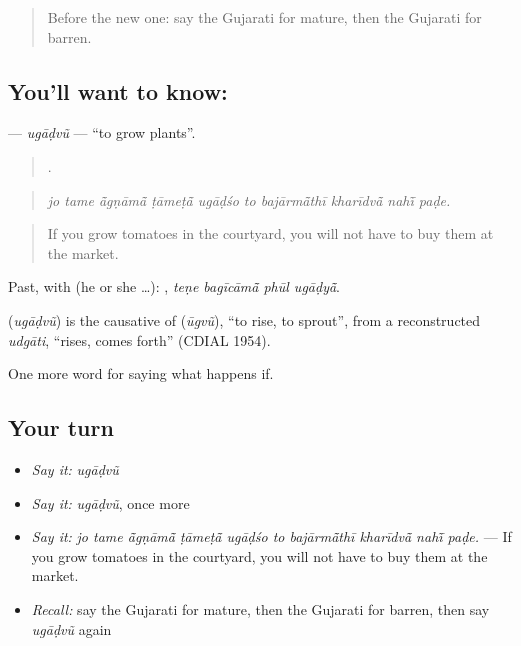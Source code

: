 \label{lesson:GU-C390-ugadvu}



\begin{quote}
Before the new one: say the Gujarati for mature, then the Gujarati for barren.
\end{quote}

\subsection*{You'll want to know: }
\textbf{} — \emph{ugāḍvũ} — \textquotedblleft{}to grow plants\textquotedblright{}.

\begin{quote}
         .
\end{quote}

\begin{quote}
\emph{jo tame ā̃gṇāmā̃ ṭāmeṭā̃ ugāḍśo to bajārmā̃thī kharīdvā̃ nahī̃ paḍe.}
\end{quote}

\begin{quote}
If you grow tomatoes in the courtyard, you will not have to buy them at the market.
\end{quote}

Past, with  (he or she …):    , \emph{teṇe bagīcāmā̃ phūl ugāḍyā̃}.

\begin{cousinweb}
\textbf{} (\emph{ugāḍvũ}) is the causative of \textbf{} (\emph{ūgvũ}), \textquotedblleft{}to rise, to sprout\textquotedblright{}, from a reconstructed \emph{udgāti}, \textquotedblleft{}rises, comes forth\textquotedblright{} (CDIAL 1954).
\end{cousinweb}

\begin{grammarlens}[title={What you've built}]
One more word for saying what happens if.
\end{grammarlens}

\subsection*{Your turn}
\begin{itemize}
\raggedright
  \item \emph{Say it:} \emph{ugāḍvũ}
  \item \emph{Say it:} \emph{ugāḍvũ}, once more
  \item \emph{Say it:} \emph{jo tame ā̃gṇāmā̃ ṭāmeṭā̃ ugāḍśo to bajārmā̃thī kharīdvā̃ nahī̃ paḍe.} — If you grow tomatoes in the courtyard, you will not have to buy them at the market.
  \item \emph{Recall:} say the Gujarati for mature, then the Gujarati for barren, then say \emph{ugāḍvũ} again
\end{itemize}

